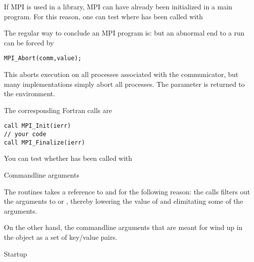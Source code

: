 If MPI is used in a library, MPI can have already been initialized in a main program.
For this reason, one can test where  has been called with
%
%

The regular way to conclude an MPI program is:
%
%
but an abnormal end to a run can be forced by
\begin{verbatim}
MPI_Abort(comm,value);
\end{verbatim}
This aborts execution on all processes associated with the communicator,
but many implementations simply abort all processes. The  parameter
is returned to the environment.

The corresponding Fortran calls are
\begin{verbatim}
call MPI_Init(ierr)
// your code
call MPI_Finalize(ierr)
\end{verbatim}

You can test whether  has been called with
%

 {Commandline arguments}

The  routines takes a reference to 
and  for the following reason: the  calls
filters out the arguments to  or ,
thereby lowering the value of  and elimitating some of the 
arguments.

On the other hand, the commandline arguments that are meant for 
wind up in the  object as a set of key/value pairs.


 {Startup}


